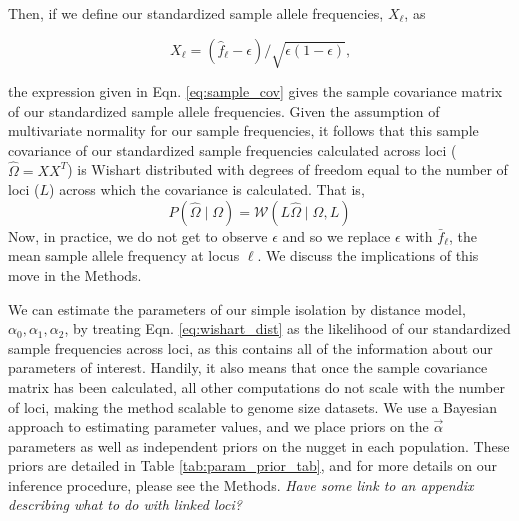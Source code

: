 \documentclass[12pt]{article}
\newcommand{\gc}[1]{{\em \color{blue} #1}}
\begin{document}
Then, if we define our standardized sample allele frequencies, $X_\ell$, as

\begin{equation}
\label{eq:standardized_sample_freqs}
X_\ell = (\hat{f}_{\ell}  - \epsilon)/\sqrt{\epsilon(1-\epsilon)}\text{,}
\end{equation}

the expression given in Eqn. \eqref{eq:sample_cov} gives the sample covariance matrix of our standardized sample allele frequencies.
Given the assumption of multivariate normality for our sample frequencies, it follows that this sample covariance of our standardized sample frequencies calculated across loci ($\widehat{\Omega} = X X^T$) is Wishart distributed with degrees of freedom equal to the number of loci ($L$) across which the covariance is calculated.
That is, 
\begin{equation}
\label{eq:wishart_dist}
P(\widehat{\Omega} \mid \Omega) = \mathcal{W}\left( L\widehat{\Omega} \mid \Omega,L \right)
\end{equation}
Now, in practice, we do not get to observe $\epsilon$ and so we replace $\epsilon$ with $\bar{f}_{\ell}$, the mean sample allele frequency at locus  $\ell$. We discuss the implications of this move in the Methods.

We can estimate the parameters of our simple isolation by distance model, $\alpha_0,\alpha_1, \alpha_2$, by treating Eqn. \eqref{eq:wishart_dist} as the likelihood of our standardized sample frequencies across loci, as this contains all of the information about our parameters of interest.  Handily, it also means that once the sample covariance matrix has been calculated, all other computations do not scale with the number of loci, making the method scalable to genome size datasets.  We use a Bayesian approach to estimating parameter values, and we place priors on the $\vec{\alpha}$ parameters as well as independent priors on the nugget in each population. These priors are detailed in Table \ref{tab:param_prior_tab}, and for more details on our inference procedure, please see the Methods.  \gc{Have some link to an appendix describing what to do with linked loci?}
\end{document}
